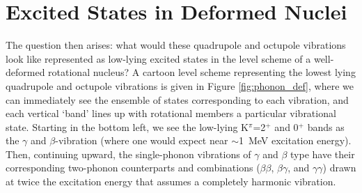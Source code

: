 


\section{Excited States in Deformed Nuclei}\label{sec:excitedstates}
The question then arises: what would these quadrupole and octupole vibrations look like represented as low-lying excited states in the level scheme of a well-deformed rotational nucleus? A cartoon level scheme representing the lowest lying quadrupole and octupole vibrations is given in Figure \ref{fig:phonon_def}, where we can immediately see the ensemble of states corresponding to each vibration, and each vertical `band' lines up with rotational members a particular vibrational state. Starting in the bottom left, we see the low-lying K$^\pi$=2$^+$ and 0$^+$ bands as the $\gamma$ and $\beta$-vibration (where one would expect near $\sim$1~MeV excitation energy). Then, continuing upward, the single-phonon vibrations of $\gamma$ and $\beta$ type have their corresponding two-phonon counterparts and combinations ($\beta\beta$, $\beta\gamma$, and $\gamma\gamma$) drawn at twice the excitation energy that assumes a completely harmonic vibration.

